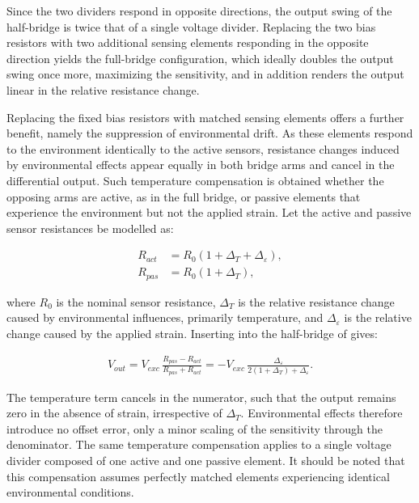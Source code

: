 Since the two dividers respond in opposite directions, the output swing of the half-bridge is twice that of a single voltage divider. Replacing the two bias resistors with two additional sensing elements responding in the opposite direction yields the full-bridge configuration, which ideally doubles the output swing once more, maximizing the sensitivity, and in addition renders the output linear in the relative resistance change.

Replacing the fixed bias resistors with matched sensing elements offers a further benefit, namely the suppression of environmental drift. As these elements respond to the environment identically to the active sensors, resistance changes induced by environmental effects appear equally in both bridge arms and cancel in the differential output. 
Such temperature compensation is obtained whether the opposing arms are active, as in the full bridge, or passive elements that experience the environment but not the applied strain. Let the active and passive sensor resistances be modelled as:

\begin{align}
    R_{\mathit{act}}&=R_0\left(1+\Delta_T+\Delta_\varepsilon\right), \label{eq:R_active}\\
    R_{\mathit{pas}}&=R_0\left(1+\Delta_T\right) \label{eq:R_passive},
\end{align}

where $R_0$ is the nominal sensor resistance, $\Delta_T$ is the relative resistance change caused by environmental influences, primarily temperature, and $\Delta_\varepsilon$ is the relative change caused by the applied strain.
Inserting  into the half-bridge of  gives:

\begin{align} \label{eq:bridge_comp}
    V_{out}=V_{exc}\,\frac{R_{\mathit{pas}}-R_{\mathit{act}}}{R_{\mathit{pas}}+R_{\mathit{act}}}
    =-V_{exc}\,\frac{\Delta_\varepsilon}{2\left(1+\Delta_T\right)+\Delta_\varepsilon}.
\end{align}

The temperature term cancels in the numerator, such that the output remains zero in the absence of strain, irrespective of $\Delta_T$. Environmental effects therefore introduce no offset error, only a minor scaling of the sensitivity through the denominator. The same temperature compensation applies to a single voltage divider composed of one active and one passive element.
It should be noted that this compensation assumes perfectly matched elements experiencing identical environmental conditions.

